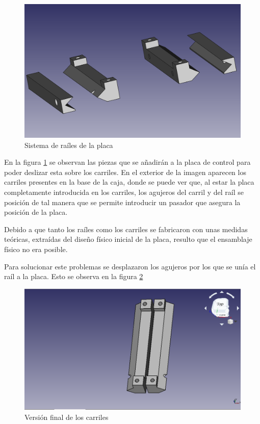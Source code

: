  \begin{figure}[H]
    \centering
    \includegraphics[width=.9\linewidth]{pictures/railes.png}
    \caption{Sistema de raíles de la placa}
    \label{fig:railes_placa}
\end{figure}

En la figura \ref{fig:railes_placa} se observan las piezas que se añadirán a la placa de control para poder deslizar esta sobre los carriles. En el exterior de la imagen aparecen los carriles presentes en la base de la caja, donde se puede ver que, al estar la placa completamente introducida en los carriles, los agujeros del carril y del raíl se posición de tal manera que se permite introducir un pasador que asegura la posición de la placa.

Debido a que tanto los raíles como los carriles se fabricaron con unas medidas teóricas, extraídas del diseño físico inicial de la placa, resulto que el ensamblaje físico no era posible.

Para solucionar este problemas se desplazaron los agujeros por los que se unía el raíl a la placa. Esto se observa en la figura \ref{fig:railes_placa_final}

 \begin{figure}[H]
    \centering
    \includegraphics[width=.9\linewidth]{pictures/RailesBien.png}
    \caption{Versión final de los carriles}
    \label{fig:railes_placa_final}
\end{figure}

